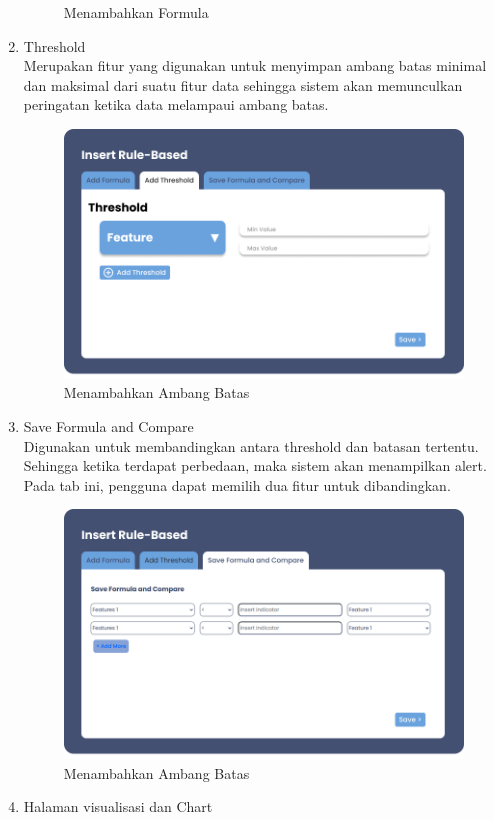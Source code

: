 \begin{enumerate}[label={\arabic*.}]
\begin{figure}[H]
		\caption{Menambahkan Formula}
		\label{gambar1}
	\end{figure}
	\item Threshold\\
	 Merupakan fitur yang digunakan untuk menyimpan ambang batas minimal dan maksimal dari suatu fitur data sehingga sistem akan memunculkan peringatan ketika data melampaui ambang batas. 
	 \begin{figure}[H]
	 	\centering
		\includegraphics[width=0.8\linewidth]{gambar/Metodologi/threshold.png}
	 	\caption{Menambahkan Ambang Batas}
	 	\label{Menambahkan Ambang Batas}
	 \end{figure}
	 \item Save Formula and Compare\\
	 Digunakan untuk membandingkan antara threshold dan batasan tertentu. Sehingga ketika terdapat perbedaan, maka sistem akan menampilkan alert. Pada tab ini, pengguna dapat memilih dua fitur untuk dibandingkan. 
	 	 \begin{figure}[H]
	 	\centering
	 	\includegraphics[width=0.8\linewidth]{gambar/Metodologi/compare.png}
	 	\caption{Menambahkan Ambang Batas}
	 	\label{Menambahkan Ambang Batas}
	 \end{figure}
	 \item Halaman visualisasi dan Chart\\

\end{enumerate}

